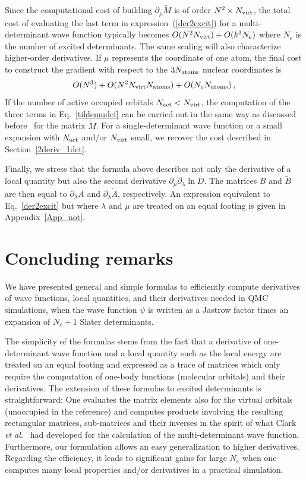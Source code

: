 \documentclass[aip,jcp,reprint,floatfix,onecolumn]{revtex4-1}
\begin{document}
Since the computational cost of building $\partial_\mu \tilde{M}$ is of order $N^2\times N_{\rm virt}$, the total cost of evaluating the last term in expression~(\ref{der2excit}) for a multi-determinant wave function typically becomes $O(N^2N_{\rm virt})+O(k^3 N_e)$ where $N_e$ is the number of excited determinants.  The same scaling will also characterize higher-order derivatives.
If $\mu$ represents the coordinate of one atom, the final cost to construct the gradient with respect to the $3 N_{\rm atoms}$ nuclear coordinates is
\begin{eqnarray}
  O(N^3)+  O (N^2 N_{\rm virt} N_{\rm atoms} ) + O (N_e N_{\rm atoms}) \,,
\nonumber
\end{eqnarray}
If the number of active occupied orbitals $N_{\rm act} < N_{\rm virt}$, the computation of the three terms in Eq.~\ref{tildemudef} can be carried out in the same way as discussed before~\cite{act_virt} for the matrix $\tilde{M}$. For a single-determinant wave function or a small expansion with $N_{\rm act}$ and/or $N_{\rm virt}$ small,  we recover the cost described in Section~\ref{2deriv_1det}.

Finally, we stress that the formula above describes not only the derivative of a local quantity but also the second derivative $\partial_\mu\partial_\lambda \ln \bar{D}$. The matrices $B$ and $\tilde{B}$ are then equal to $\partial_\lambda A$ and $\partial_\lambda \tilde{A}$, respectively. An expression equivalent to Eq.~\ref{der2excit} but where $\lambda$ and $\mu$ are treated on an equal footing is given in Appendix~\ref{App_not}.

\section{Concluding remarks}

We have presented general and simple formulas to efficiently compute derivatives of wave functions, local quantities, and their derivatives needed in QMC simulations, when
the wave function $\psi$ is written as a Jastrow factor times an expansion of $N_e+1$ Slater determinants.

The simplicity of the formulas stems from the fact that a derivative of one-determinant wave function and a local quantity
such as the local energy are treated on an equal footing and expressed as a trace of matrices which only require the computation of one-body functions
(molecular orbitals) and their derivatives. The extension of these formulas to excited determinants is straightforward: One evaluates the matrix elements also
for the virtual orbitals (unoccupied in the reference) and computes products involving the resulting rectangular matrices, sub-matrices and their
inverses in the spirit of what Clark {\it et al.}~\cite{Clark11} had developed for the calculation of the multi-determinant wave function.
Furthermore, our formulation allows an easy generalization to higher derivatives.
Regarding the efficiency, it leads to significant gains for large $N_e$ when one computes many local properties and/or derivatives in a practical simulation.
\end{document}
